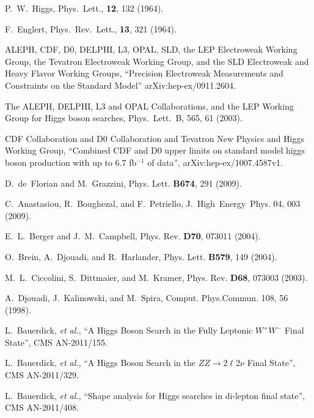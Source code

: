
\clearpage

\vspace*{-0.2cm}

 P.~W.~Higgs, Phys.~Lett., {\bf 12}, 132 (1964).

 F.~Englert, Phys.~Rev.~Lett., {\bf 13}, 321 (1964).

ALEPH, CDF, D0, DELPHI, L3, OPAL, SLD, the LEP Electroweak Working Group, 
the Tevatron Electroweak Working Group, and the SLD Electroweak and Heavy Flavor Working Groups, ``Precision Electroweak 
Measurements and Constraints on the Standard Model'' arXiv:hep-ex/0911.2604.

The ALEPH, DELPHI, L3 and OPAL Collaborations, and the LEP Working Group for Higgs boson searches,
Phys.~Lett.~B, 565, 61 (2003).

CDF Collaboration and D0 Collaboration and Tevatron New Physics and Higgs Working Group, 
``Combined CDF and D0 upper limits on standard model higgs boson production with up to 6.7 fb$^{-1}$ of data'', arXiv:hep-ex/1007.4587v1.

D.~de~Florian and M.~Grazzini, Phys. Lett. {\bf B674}, 291 (2009).

C.~Anastasiou, R.~Boughezal, and F.~Petriello, J.~High~Energy~Phys. 04, 003 (2009).

E.~L.~Berger and J.~M.~Campbell, Phys. Rev. {\bf D70}, 073011 (2004).

O.~Brein, A.~Djouadi, and R.~Harlander, Phys. Lett. {\bf B579}, 149 (2004).

M.~L.~Ciccolini, S.~Dittmaier, and M.~Kramer, Phys. Rev. {\bf D68}, 073003 (2003).

A.~Djouadi, J.~Kalinowski, and M.~Spira, Comput. Phys.Commun. 108, 56 (1998).

L.~Bauerdick, \textit{et al.}, ``A Higgs Boson Search in the Fully Leptonic $W^{+}W^{-}$ Final State'', CMS AN-2011/155.

L.~Bauerdick, \textit{et al.}, ``A Higgs Boson Search in the $ZZ \to 2\ell2\nu$ Final State'', CMS AN-2011/329.

L.~Bauerdick, \textit{et al.}, ``Shape analysis for Higgs searches in di-lepton final state'', CMS AN-2011/408.

